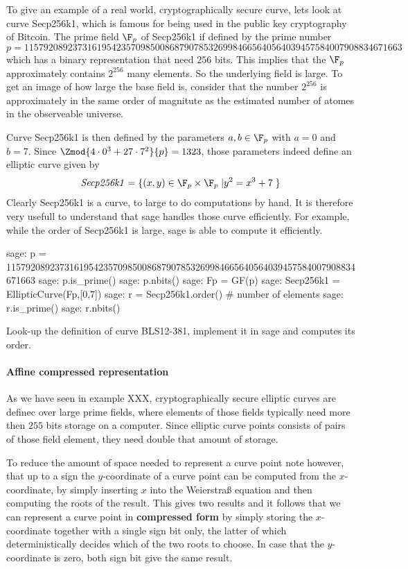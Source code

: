 \begin{example}To give an example of a real world, cryptographically secure curve, lets look at curve Secp256k1, which is famous for being used in the public key cryptography of Bitcoin. The prime field $\F_p$ of Secp256k1 if defined by the prime number
$$
p = \scriptstyle 115792089237316195423570985008687907853269984665640564039457584007908834671663
$$
which has a binary representation that need $256$ bits. This implies that the $\F_p$ approximately contains $2^{256}$ many elements. So the underlying field is large. To get an image of how large the base field is, consider that the number $2^{256}$ is approximately in the same order of magnitute as the estimated number of atomes in the observeable universe. 

Curve Secp256k1 is then defined by the parameters $a,b\in \F_p$ with $a=0$ and $b=7$. Since $\Zmod{4\cdot 0^3 + 27\cdot 7^2}{p}=1323$, those parameters indeed define an elliptic curve given by
$$
\mathit{Secp256k1} = \{(x,y)\in \F_p\times \F_p\;| y^2 = x^3 +7\;\} 
$$
Clearly Secp256k1 is a curve, to large to do computations by hand. It is therefore very usefull to understand that sage handles those curve efficiently. For example, while the order of Secp256k1 is large, sage is able to compute it efficiently.
\begin{sagecommandline}
sage: p = 115792089237316195423570985008687907853269984665640564039457584007908834671663
sage: p.is_prime()
sage: p.nbits()
sage: Fp = GF(p)
sage: Secp256k1 = EllipticCurve(Fp,[0,7])
sage: r = Secp256k1.order() # number of elements
sage: r.is_prime()
sage: r.nbits()
\end{sagecommandline}
\end{example}
\begin{exercise}
Look-up the definition of curve BLS12-381, implement it in sage and computes its order.
\end{exercise}
\paragraph{Affine compressed representation} As we have seen in example XXX, cryptographically secure elliptic curves are definec over large prime fields, where elements of those fields typically need more then $255$ bits storage on a computer. Since elliptic curve points consists of pairs of those field element, they need double that amount of storage.

To reduce the amount of space needed to represent a curve point note however, that up to a sign the $y$-coordinate of a curve point can be computed from the $x$-coordinate, by simply inserting $x$ into the Weierstraß equation and then computing the roots of the result. This gives two results and it follows that we can represent a curve point in \textbf{compressed form} by simply storing the $x$-coordinate together with a single sign bit only, the latter of which deterministically decides which of the two roots to choose. In case that the $y$-coordinate is zero, both sign bit give the same result.

